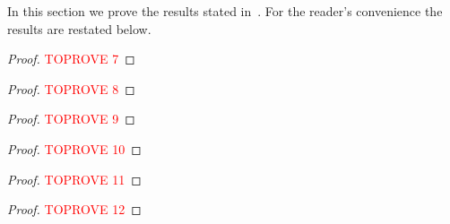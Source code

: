 \documentclass[a4paper,11pt]{article}
\theoremstyle{definition}
\begin{document}
In this section we prove the results stated in~.
For the reader's convenience the results are restated below.

\LEfouriercoefficientaux*

\begin{proof}\textcolor{red}{TOPROVE 7}\end{proof}

\LEmultiplicitytrivialrestriction*

\begin{proof}\textcolor{red}{TOPROVE 8}\end{proof}

\LEsubrepresentationsrestriction*

\begin{proof}\textcolor{red}{TOPROVE 9}\end{proof}

\LEfourierconvolution*

\begin{proof}\textcolor{red}{TOPROVE 10}\end{proof}

\LEsimilarrepresentations*

\begin{proof}\textcolor{red}{TOPROVE 11}\end{proof}


\LEepsilonnoise*

\begin{proof}\textcolor{red}{TOPROVE 12}\end{proof}



\end{document}
